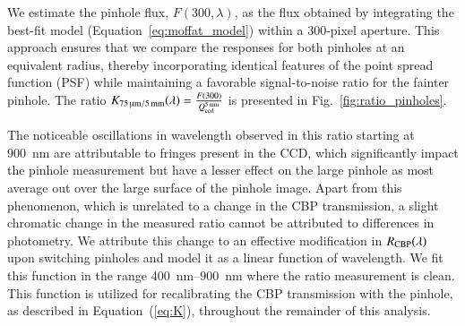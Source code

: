 

We estimate the pinhole flux, $F(300, \lambda)$, as the flux obtained by integrating the best-fit model (Equation~\ref{eq:moffat_model}) within a 300-pixel aperture. This approach ensures that we compare the \SD responses for both pinholes at an equivalent radius, thereby incorporating identical features of the point spread function (PSF) while maintaining a favorable signal-to-noise ratio for the fainter pinhole. The ratio $K_\mathrm{\SI{75}{\micro\meter}/\SI{5}{\milli\meter}}(\lambda)=\frac{F(300)}{Q_{\mathrm{ccd}}^{\SI{5}{\milli\meter}}}$ is presented in Fig.~\ref{fig:ratio_pinholes}.

The noticeable oscillations in wavelength observed in this ratio starting at \SI{900}{nm} are attributable to fringes present in the CCD, which significantly impact the \spinhole pinhole measurement but have a lesser effect on the large pinhole as most average out over the large surface of the pinhole image. Apart from this phenomenon, which is unrelated to a change in the CBP transmission, a slight chromatic change in the measured ratio cannot be attributed to differences in photometry. We attribute this change to an effective modification in $R_{\mathrm{CBP}}(\lambda)$ upon switching pinholes and model it as a linear function of wavelength. We fit this function in the range \SIrange{400}{900}{\nano\meter} where the ratio measurement is clean. This function is utilized for recalibrating the CBP transmission with the \spinhole pinhole, as described in Equation~(\ref{eq:K}), throughout the remainder of this analysis.

